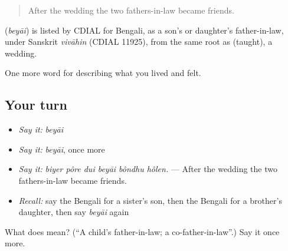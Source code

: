\begin{quote}
After the wedding the two fathers-in-law became friends.
\end{quote}

\begin{cousinweb}
\textbf{} (\emph{beyāi}) is listed by CDIAL for Bengali, as a son's or daughter's father-in-law, under Sanskrit \emph{vivāhin} (CDIAL 11925), from the same root as  (taught), a wedding.
\end{cousinweb}

\begin{grammarlens}[title={What you've built}]
One more word for describing what you lived and felt.
\end{grammarlens}

\subsection*{Your turn}
\begin{itemize}
\raggedright
  \item \emph{Say it:} \emph{beyāi}
  \item \emph{Say it:} \emph{beyāi}, once more
  \item \emph{Say it:} \emph{biyer pôre dui beyāi bôndhu hôlen.} — After the wedding the two fathers-in-law became friends.
  \item \emph{Recall:} say the Bengali for a sister's son, then the Bengali for a brother's daughter, then say \emph{beyāi} again
\end{itemize}

\begin{tcolorbox}[breakable,colback=teal!4,colframe=teal!35!black,title={Before you move on}]
What does  mean? (\textquotedblleft{}A child's father-in-law; a co-father-in-law\textquotedblright{}.) Say it once more.
\end{tcolorbox}
